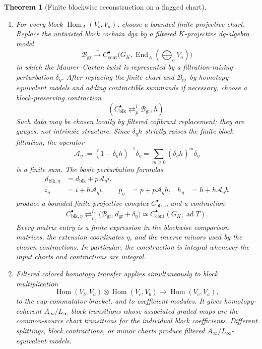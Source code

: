 \documentclass[11pt]{article}
\newtheorem{theorem}{Theorem}[section]
\theoremstyle{definition}
\begin{document}
\begin{theorem}[Finite blockwise reconstruction on a flagged chart]
\begin{enumerate}[label=\textnormal{(\roman*)}]
\item For every block $\operatorname{Hom}_A(V_b,V_a)$, choose a bounded finite-projective chart.  Replace the untwisted block cochain dga by a filtered $K$-projective dg-algebra model
\[
\mathcal B_{\mathrm{gr}}
\xrightarrow{\ \sim\ }
C^\bullet_{\mathrm{cont}}
\bigl(G_K,\operatorname{End}_A(\textstyle\bigoplus_aV_a)\bigr)
\]
in which the Maurer--Cartan twist is represented by a filtration-raising perturbation $\delta_\eta$.  After replacing the finite chart and $\mathcal B_{\mathrm{gr}}$ by homotopy-equivalent models and adding contractible summands if necessary, choose a block-preserving contraction
\[
(C_{\mathrm{blk}}^\bullet
 \mathop{\rightleftarrows}^{i}_{p}
 \mathcal B_{\mathrm{gr}},h).
\]
Such data may be chosen locally by filtered cofibrant replacement; they are gauges, not intrinsic structure.  Since $\delta_\eta h$ strictly raises the finite block filtration, the operator
\begin{equation}\label{eq:flagged-finite-perturbation}
\mathcal A_\eta
:=(1-\delta_\eta h)^{-1}\delta_\eta
=\sum_{m\ge0}(\delta_\eta h)^m\delta_\eta
\end{equation}
is a finite sum.  The basic perturbation formulas
\begin{align}
 d_{\mathrm{blk},\eta}
 &=d_{\mathrm{blk}}+p\mathcal A_\eta i,
 \label{eq:flagged-block-differential}\\
 i_\eta&=i+h\mathcal A_\eta i,
 &p_\eta&=p+p\mathcal A_\eta h,
 &h_\eta&=h+h\mathcal A_\eta h
 \label{eq:flagged-block-contraction}
\end{align}
produce a bounded finite-projective complex
$C_{\mathrm{blk},\eta}^\bullet$ and a contraction
\[
C_{\mathrm{blk},\eta}^\bullet
\mathop{\rightleftarrows}^{i_\eta}_{p_\eta}
\bigl(\mathcal B_{\mathrm{gr}},d_{\mathrm{gr}}+\delta_\eta\bigr)
\simeq
C^\bullet_{\mathrm{cont}}(G_K,\operatorname{ad}T).
\]
Every matrix entry is a finite expression in the blockwise comparison matrices, the extension coordinates $\eta$, and the inverse minors used by the chosen contractions.  In particular, the construction is integral whenever the input charts and contractions are integral.

\item Filtered colored homotopy transfer applies simultaneously to block multiplication
\[
\operatorname{Hom}(V_b,V_a)
\otimes
\operatorname{Hom}(V_c,V_b)
\longrightarrow
\operatorname{Hom}(V_c,V_a),
\]
to the cup-commutator bracket, and to coefficient modules.  It gives homotopy-coherent $A_\infty/L_\infty$ block transitions whose associated graded maps are the common-source chart transitions for the individual block coefficients.  Different splittings, block contractions, or minor charts produce filtered $A_\infty/L_\infty$-equivalent models.
\end{enumerate}


\end{theorem}
\end{document}
